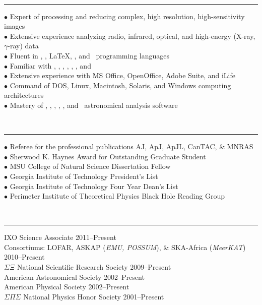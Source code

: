 \documentclass[12pt]{cv}
\begin{document}
{\large{}}\vspace{-0.3cm}\\
\rule{\linewidth}{0.5pt}
{\scriptsize{$\bullet$}} Expert of processing and reducing complex, high resolution, high-sensitivity images\\
{\scriptsize{$\bullet$}} Extensive experience analyzing radio, infrared, optical, and high-energy (X-ray, $\gamma$-ray) data\\
{\scriptsize{$\bullet$}} Fluent in \html, \idl, \LaTeX, \perl, and \python\ programming languages\\
{\scriptsize{$\bullet$}} Familiar with \clang, \fortran, \matlab, \meq, \mysql, \supmo, and \tickle\\
{\scriptsize{$\bullet$}} Extensive experience with MS Office, OpenOffice, Adobe Suite, and iLife\\
{\scriptsize{$\bullet$}} Command of DOS, Linux, Macintosh, Solaris, and Windows computing architectures\\
{\scriptsize{$\bullet$}} Mastery of \aips, \casa, \ciao, \iraf, \osa, and \sas\ astronomical analysis software

{\large{}}\vspace{-0.3cm}\\
\rule{\linewidth}{0.5pt}
{\scriptsize{$\bullet$}} Referee for the professional publications AJ, ApJ, ApJL, CanTAC, \& MNRAS\\
{\scriptsize{$\bullet$}} Sherwood K. Haynes Award for Outstanding Graduate Student\\
{\scriptsize{$\bullet$}} MSU College of Natural Science Dissertation Fellow\\
{\scriptsize{$\bullet$}} Georgia Institute of Technology President's List\\
{\scriptsize{$\bullet$}} Georgia Institute of Technology Four Year Dean's List\\
{\scriptsize{$\bullet$}} Perimeter Institute of Theoretical Physics Black Hole Reading Group

{\large{}}\vspace{-0.3cm}\\
\rule{\linewidth}{0.5pt}
IXO Science Associate \hfill 2011--Present\\
Consortiums: LOFAR, ASKAP ({\it{EMU, POSSUM}}), \& SKA-Africa ({\it{MeerKAT}}) \hfill 2010--Present\\
$\Sigma \Xi$ National Scientific Research Society \hfill 2009--Present\\
American Astronomical Society \hfill 2002--Present\\
American Physical Society \hfill 2002--Present\\
$\Sigma \Pi \Sigma$ National Physics Honor Society \hfill 2001--Present
\end{document}
